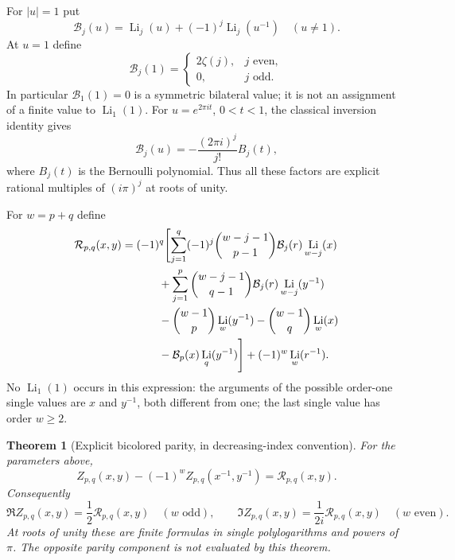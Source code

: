 \documentclass[11pt,a4paper]{article}
\numberwithin{equation}{section}
\newtheorem{theorem}{Theorem}[section]
\theoremstyle{definition}
\theoremstyle{remark}
\DeclareMathOperator{\Li}{Li}
\begin{document}
For $|u|=1$ put
\[
 \mathcal B_j(u)=\Li_j(u)+(-1)^j\Li_j(u^{-1})\quad(u\ne1).
\]
At $u=1$ define
\[
 \mathcal B_j(1)=\begin{cases}2\zeta(j),&j\text{ even},\\0,&j\text{ odd}.
 \end{cases}
\]
In particular $\mathcal B_1(1)=0$ is a symmetric bilateral value;
it is not an assignment of a finite value to $\Li_1(1)$.
For $u=e^{2\pi i t}$, $0<t<1$, the classical inversion identity gives
\[
 \mathcal B_j(u)=-\frac{(2\pi i)^j}{j!}B_j(t),
\]
where $B_j(t)$ is the Bernoulli polynomial. Thus all these factors are
explicit rational multiples of $(i\pi)^j$ at roots of unity.

For $w=p+q$ define
\begin{align}
 \mathcal R_{p,q}(x,y)={}&(-1)^q\Biggl[
 \sum_{j=1}^q(-1)^j\binom{w-j-1}{p-1}
       \mathcal B_j(r)\Li_{w-j}(x)\notag\\
 &\qquad+\sum_{j=1}^p\binom{w-j-1}{q-1}
       \mathcal B_j(r)\Li_{w-j}(y^{-1})\notag\\
 &\qquad-\binom{w-1}{p}\Li_w(y^{-1})
       -\binom{w-1}{q}\Li_w(x)
       \notag\\
 &\qquad-\mathcal B_p(x)\Li_q(y^{-1})\Biggr]
       +(-1)^w\Li_w(r^{-1}).
 \label{bip:eq:R}
\end{align}
No $\Li_1(1)$ occurs in this expression: the arguments of the possible
order-one single values are $x$ and $y^{-1}$, both different from one;
the last single value has order $w\ge2$.

\begin{theorem}[Explicit bicolored parity, in decreasing-index convention]
\label{bip:thm:parity}
For the parameters above,
\begin{equation}
 \boxed{\quad Z_{p,q}(x,y)-(-1)^wZ_{p,q}(x^{-1},y^{-1})
      =\mathcal R_{p,q}(x,y).\quad}
 \label{bip:eq:parity}
\end{equation}
Consequently
\[
 \Re Z_{p,q}(x,y)=\frac12\mathcal R_{p,q}(x,y)
       \quad(w\text{ odd}),
 \qquad
 \Im Z_{p,q}(x,y)=\frac1{2i}\mathcal R_{p,q}(x,y)
       \quad(w\text{ even}).
\]
At roots of unity these are finite formulas in single polylogarithms
and powers of $\pi$.  The opposite parity component is not evaluated
by this theorem.
\end{theorem}
\end{document}
